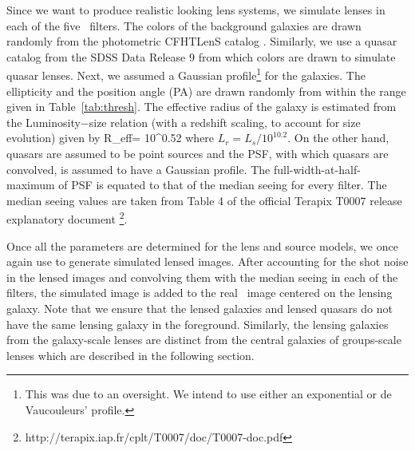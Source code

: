 \documentclass[useAMS,usenatbib,a4paper]{mn2e}
\begin{document}
Since we want to produce realistic looking lens systems, we simulate
lenses in each of the five \cfhtls~filters. The colors of the background
galaxies are drawn randomly from the photometric CFHTLenS catalog
\citep{Hildebrandt2012,Erben2013}.  Similarly, we use a quasar catalog
from the SDSS Data Release 9 \citep{Paris2012} from which colors are
drawn to simulate quasar lenses. Next, we assumed a Gaussian
profile\footnote{This was due to an oversight. We intend to use either
an exponential or de Vaucouleurs' profile.} for
the galaxies. The ellipticity and the position angle (PA) are drawn
randomly from within the range given in Table~\ref{tab:thresh}. The
effective radius of the galaxy is estimated from the Luminosity$-$size
relation \citep{Bernardi2003} (with a redshift scaling, to account for
size evolution) given by
\be
R_{\rm eff}= 10^{0.52} 
\ee
where $L_r=L_s/10^{10.2}$. On the other hand, quasars are assumed to be
point sources and the PSF, with which quasars are convolved, is assumed
to have a Gaussian profile. The full-width-at-half-maximum of PSF is
equated to that of the median seeing for every filter. The median seeing
values are taken from Table 4 of the official Terapix T0007 release
explanatory document \footnote{
http://terapix.iap.fr/cplt/T0007/doc/T0007-doc.pdf}.

Once all the parameters are determined for the lens and source models, we once
again use \gravlens to generate simulated lensed images.  After accounting for the shot
noise in the lensed images and convolving them with the median seeing in each of
the filters, the simulated image is added to the real \cfhtls~image centered
on the lensing galaxy. Note that we ensure that the lensed galaxies and
lensed quasars do not have the same lensing galaxy in the foreground. Similarly,
the lensing galaxies from the galaxy-scale lenses are distinct from the central
galaxies of groups-scale lenses which are described in the following section.
\end{document}
